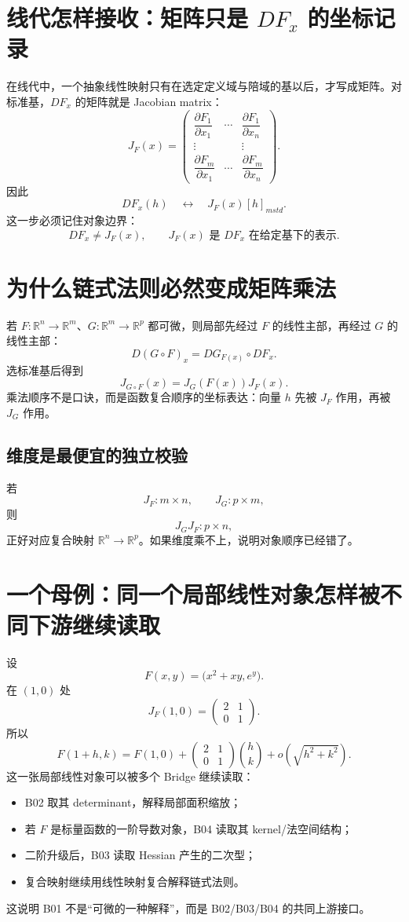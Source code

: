 \documentclass[profile=standard]{ipara-handbook}
\begin{document}
\section{线代怎样接收：矩阵只是 $DF_x$ 的坐标记录}
在线代中，一个抽象线性映射只有在选定定义域与陪域的基以后，才写成矩阵。对标准基，$DF_x$ 的矩阵就是 Jacobian matrix：
\[
J_F(x)
=
\begin{pmatrix}
\dfrac{\partial F_1}{\partial x_1}&\cdots&\dfrac{\partial F_1}{\partial x_n}\\
\vdots&&\vdots\\
\dfrac{\partial F_m}{\partial x_1}&\cdots&\dfrac{\partial F_m}{\partial x_n}
\end{pmatrix}.
\]
因此
\[
DF_x(h)\quad\leftrightarrow\quad J_F(x)[h]_{
m std}.
\]
这一步必须记住对象边界：
\[
\boxed{DF_x\neq J_F(x),\qquad J_F(x)\text{ 是 }DF_x\text{ 在给定基下的表示}.}
\]

\section{为什么链式法则必然变成矩阵乘法}
若 $F:\mathbb R^n\to\mathbb R^m$、$G:\mathbb R^m\to\mathbb R^p$ 都可微，则局部先经过 $F$ 的线性主部，再经过 $G$ 的线性主部：
\[
D(G\circ F)_x=DG_{F(x)}\circ DF_x.
\]
选标准基后得到
\[
J_{G\circ F}(x)=J_G(F(x))J_F(x).
\]
乘法顺序不是口诀，而是函数复合顺序的坐标表达：向量 $h$ 先被 $J_F$ 作用，再被 $J_G$ 作用。

\subsection{维度是最便宜的独立校验}
若
\[
J_F:m\times n,
\qquad
J_G:p\times m,
\]
则
\[
J_GJ_F:p\times n,
\]
正好对应复合映射 $\mathbb R^n\to\mathbb R^p$。如果维度乘不上，说明对象顺序已经错了。

\section{一个母例：同一个局部线性对象怎样被不同下游继续读取}
设
\[
F(x,y)=\bigl(x^2+xy,e^y\bigr).
\]
在 $(1,0)$ 处
\[
J_F(1,0)=
\begin{pmatrix}
2&1\\0&1
\end{pmatrix}.
\]
所以
\[
F(1+h,k)=F(1,0)+
\begin{pmatrix}
2&1\\0&1
\end{pmatrix}
\binom hk+o\!\left(\sqrt{h^2+k^2}\right).
\]
这一张局部线性对象可以被多个 Bridge 继续读取：
\begin{itemize}
\item B02 取其 determinant，解释局部面积缩放；
\item 若 $F$ 是标量函数的一阶导数对象，B04 读取其 kernel/法空间结构；
\item 二阶升级后，B03 读取 Hessian 产生的二次型；
\item 复合映射继续用线性映射复合解释链式法则。
\end{itemize}
这说明 B01 不是“可微的一种解释”，而是 B02/B03/B04 的共同上游接口。
\end{document}
